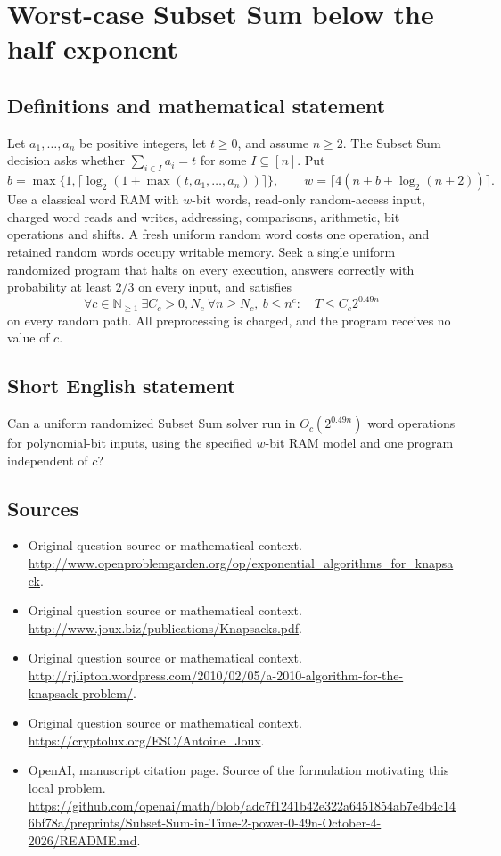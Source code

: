 \documentclass[11pt]{article}
\begin{document}
\section*{Worst-case Subset Sum below the half exponent}\label{statement}
\subsection{Definitions and mathematical statement}
Let $a_1,\ldots,a_n$ be positive integers, let $t\ge0$, and assume $n\ge2$. The Subset Sum decision asks whether $\sum_{i\in I}a_i=t$ for some $I\subseteq[n]$. Put
\[
 b=\max\{1,\lceil\log_2(1+\max(t,a_1,\ldots,a_n))\rceil\},\qquad
 w=\lceil4(n+b+\log_2(n+2))\rceil.
\]
Use a classical word RAM with $w$-bit words, read-only random-access input, charged word reads and writes, addressing, comparisons, arithmetic, bit operations and shifts. A fresh uniform random word costs one operation, and retained random words occupy writable memory. Seek a single uniform randomized program that halts on every execution, answers correctly with probability at least $2/3$ on every input, and satisfies
\[
 \forall c\in\mathbb N_{\ge1}\ \exists C_c>0,N_c\ \forall n\ge N_c,\ b\le n^c:\quad
 T\le C_c2^{0.49n}
\]
on every random path. All preprocessing is charged, and the program receives no value of $c$.

\subsection{Short English statement}
Can a uniform randomized Subset Sum solver run in $O_c(2^{0.49n})$ word operations for polynomial-bit inputs, using the specified $w$-bit RAM model and one program independent of $c$?

\subsection{Sources}
\begin{itemize}
\item[S1] Original question source or mathematical context.
\url{http://www.openproblemgarden.org/op/exponential_algorithms_for_knapsack}.
\item[S2] Original question source or mathematical context.
\url{http://www.joux.biz/publications/Knapsacks.pdf}.
\item[S3] Original question source or mathematical context.
\url{http://rjlipton.wordpress.com/2010/02/05/a-2010-algorithm-for-the-knapsack-problem/}.
\item[S4] Original question source or mathematical context.
\url{https://cryptolux.org/ESC/Antoine_Joux}.
\item[S5] OpenAI, manuscript citation page. Source of the formulation motivating this local problem.
\url{https://github.com/openai/math/blob/adc7f1241b42e322a6451854ab7e4b4c146bf78a/preprints/Subset-Sum-in-Time-2-power-0-49n-October-4-2026/README.md}.
\end{itemize}
\end{document}
